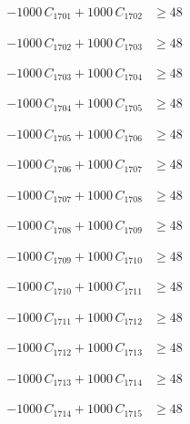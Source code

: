 \documentclass[a4paper,11pt]{article}
\begin{document}
\begin{align}
-1000\,C_{1701} + 1000\,C_{1702} &\geq 48 \nonumber
\end{align}

\begin{align}
-1000\,C_{1702} + 1000\,C_{1703} &\geq 48 \nonumber
\end{align}

\begin{align}
-1000\,C_{1703} + 1000\,C_{1704} &\geq 48 \nonumber
\end{align}

\begin{align}
-1000\,C_{1704} + 1000\,C_{1705} &\geq 48 \nonumber
\end{align}

\begin{align}
-1000\,C_{1705} + 1000\,C_{1706} &\geq 48 \nonumber
\end{align}

\begin{align}
-1000\,C_{1706} + 1000\,C_{1707} &\geq 48 \nonumber
\end{align}

\begin{align}
-1000\,C_{1707} + 1000\,C_{1708} &\geq 48 \nonumber
\end{align}

\begin{align}
-1000\,C_{1708} + 1000\,C_{1709} &\geq 48 \nonumber
\end{align}

\begin{align}
-1000\,C_{1709} + 1000\,C_{1710} &\geq 48 \nonumber
\end{align}

\begin{align}
-1000\,C_{1710} + 1000\,C_{1711} &\geq 48 \nonumber
\end{align}

\begin{align}
-1000\,C_{1711} + 1000\,C_{1712} &\geq 48 \nonumber
\end{align}

\begin{align}
-1000\,C_{1712} + 1000\,C_{1713} &\geq 48 \nonumber
\end{align}

\begin{align}
-1000\,C_{1713} + 1000\,C_{1714} &\geq 48 \nonumber
\end{align}

\begin{align}
-1000\,C_{1714} + 1000\,C_{1715} &\geq 48 \nonumber
\end{align}
\end{document}
